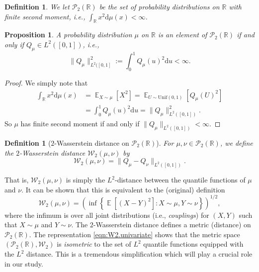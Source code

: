 \documentclass{article}
\DeclareMathOperator{\bE}{\mathbb{E}}
\newcommand{\bR}{\mathbb{R}}
\newcommand{\dd}{\mathrm{d}}
\newcommand{\cP}{\mathcal{P}}
\newcommand{\W}{\mathcal{W}_2}
\numberwithin{equation}{section}
\newtheorem{proposition}[theorem]{Proposition}
\newtheorem{definition}[theorem]{Definition}
\begin{document}
\begin{definition}
We let $\cP_2(\bR)$ be the set of probability distributions on $\bR$ with finite second moment, i.e., $\int_{\bR} x^2 \dd \mu(x) < \infty$.
\end{definition}

\begin{proposition}
A probability distribution $\mu$ on $\bR$ is an element of $\cP_2(\bR)$ if and only if $Q_{\mu} \in L^2([0, 1])$, i.e.,
\[
\| Q_{\mu} \|_{L^2([0, 1]}^2 := \int_0^1 Q_{\mu}(u)^2 \dd u < \infty.
\]
\end{proposition}
\begin{proof}
We simply note that
\begin{equation*}
\begin{split}
\int_{\bR} x^2 \dd \mu(x) &= \bE_{X \sim \mu}[X^2] = \bE_{U \sim \mathrm{Unif}(0, 1)}[Q_{\mu}(U)^2] \\
&= \int_0^1 Q_{\mu}(u)^2 \dd u = \| Q_{\mu} \|_{L^2([0, 1])}^2.
\end{split}
\end{equation*}
So $\mu$ has finite second moment if and only if $\| Q_{\mu} \|_{L^2([0, 1])} < \infty$.
\end{proof}

\begin{definition}[$2$-Wasserstein distance on $\cP_2(\bR)$] \label{def:2.Wasserstein.univariate}
For $\mu, \nu \in \cP_2(\bR)$, we define the $2$-Wasserstein distance $\W(\mu, \nu)$ by
\begin{equation} \label{eqn:W2.univariate}
\W(\mu, \nu) = \| Q_{\mu} - Q_{\nu} \|_{L^2([0, 1])}.
\end{equation}
\end{definition}

That is, $\W(\mu, \nu)$ is simply the $L^2$-distance between the quantile functions of $\mu$ and $\nu$. It can be shown that this is equivalent to the (original) definition
\begin{equation} \label{eqn:W2.original}
\W(\mu, \nu) = \left( \inf \left\{ \bE\left[ (X - Y)^2 \right]  : X \sim \mu, Y \sim \nu \right\} \right)^{1/2},
\end{equation}
where the infimum is over all joint distributions (i.e., {\it couplings}) for $(X, Y)$ such that $X \sim \mu$ and $Y \sim \nu$. The $2$-Wasserstein distance defines a metric (distance) on $\cP_2(\bR)$. The representation \eqref{eqn:W2.univariate} shows that the metric space $(\cP_2(\bR), \W)$ is {\it isometric} to the set of $L^2$ quantile functions equipped with the $L^2$ distance. This is a tremendous simplification which will play a crucial role in our study. 
\end{document}
